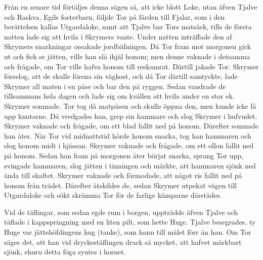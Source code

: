 Från en senare tid förtäljes denna sägen så, att icke blott Loke, utan
äfven Tjalve och Raskva, Egils fosterbarn, följde Tor på färden till
Fjalar, som i den berättelsen kallas Utgardaloke, samt att Tjalve bar
Tors matsäck, tills de första
natten lade sig att hvila i Skrymers vante. Under natten inträffade den
af Skrymers snarkningar orsakade jordbäfningen. Då Tor fram mot morgonen
gick ut och fick se jätten, ville han slå ihjäl honom; men denne vaknade
i detsamma och frågade, om Tor ville hafva honom till reskamrat. Därtill
jakade Tor. Skrymer föreslog, att de skulle förena sin vägkost, och då
Tor därtill samtyckte, lade Skrymer all maten i en påse och bar den på
ryggen. Sedan vandrade de tillsammans hela dagen och lade sig om kvällen
att hvila under en stor ek. Skrymer somnade. Tor tog då matpåsen och
skulle öppna den, men kunde icke få upp knutarne. Då vredgades han, grep
sin hammare och slog Skrymer i hufvudet. Skrymer vaknade och frågade, om
ett blad fallit ned på honom. Därefter somnade han åter. När Tor vid
midnattstid hörde honom snarka, tog han hammaren och slog honom midt i
hjässan. Skrymer vaknade och frågade, om ett ollon fallit ned på honom.
Sedan han fram på morgonen åter börjat snarka, sprang Tor upp, svingade
hammaren, slog jätten i tinningen och märkte, att hammaren sjönk ned
ända till skaftet. Skrymer vaknade och förmodade, att något ris fallit
ned på honom från trädet. Därefter åtskildes de, sedan Skrymer utpekat
vägen till Utgardaloke och sökt skrämma Tor för de farlige kämparne
därstädes.

Vid de täflingar, som sedan egde rum i borgen, uppträdde äfven Tjalve
och täflade i kappspringning med en liten pilt, som hette Huge. Tjalve
besegrades, ty Huge var jättehöfdingens hug (tanke), som hann till målet
förr än han. Om Tor säges det, att han vid dryckestäflingen drack så
mycket, att hafvet märkbart sjönk, ehuru detta föga syntes i hornet.

\endSecII



